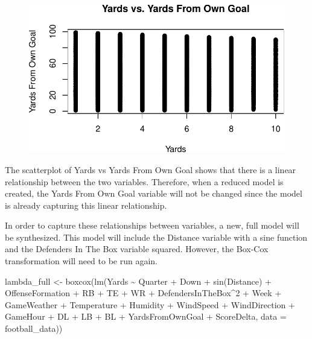 \documentclass[
  super,
  preprint,
  3p]{elsarticle}
\newenvironment{Shaded}{\begin{snugshade}}{\end{snugshade}}
\newcommand{\AttributeTok}[1]{\textcolor[rgb]{0.40,0.45,0.13}{#1}}
\newcommand{\DecValTok}[1]{\textcolor[rgb]{0.68,0.00,0.00}{#1}}
\newcommand{\FunctionTok}[1]{\textcolor[rgb]{0.28,0.35,0.67}{#1}}
\newcommand{\NormalTok}[1]{\textcolor[rgb]{0.00,0.23,0.31}{#1}}
\newcommand{\OtherTok}[1]{\textcolor[rgb]{0.00,0.23,0.31}{#1}}
\newcommand{\SpecialCharTok}[1]{\textcolor[rgb]{0.37,0.37,0.37}{#1}}
\begin{document}
\begin{figure}[H]

{\centering \includegraphics{project_report_files/figure-pdf/unnamed-chunk-30-1.pdf}

}

\end{figure}

The scatterplot of Yards vs Yards From Own Goal shows that there is a
linear relationship between the two variables. Therefore, when a reduced
model is created, the Yards From Own Goal variable will not be changed
since the model is already capturing this linear relationship.

In order to capture these relationships between variables, a new, full
model will be synthesized. This model will include the Distance variable
with a sine function and the Defenders In The Box variable squared.
However, the Box-Cox transformation will need to be run again.

\begin{Shaded}
\begin{Highlighting}[]
\NormalTok{lambda\_full }\OtherTok{\textless{}{-}} \FunctionTok{boxcox}\NormalTok{(}\FunctionTok{lm}\NormalTok{(Yards }\SpecialCharTok{\textasciitilde{}}\NormalTok{ Quarter }\SpecialCharTok{+}\NormalTok{ Down }\SpecialCharTok{+} \FunctionTok{sin}\NormalTok{(Distance) }\SpecialCharTok{+}\NormalTok{ OffenseFormation }\SpecialCharTok{+}\NormalTok{ RB }\SpecialCharTok{+}\NormalTok{ TE }\SpecialCharTok{+}\NormalTok{ WR }\SpecialCharTok{+}\NormalTok{ DefendersInTheBox}\SpecialCharTok{\^{}}\DecValTok{2} \SpecialCharTok{+}\NormalTok{ Week }\SpecialCharTok{+}\NormalTok{ GameWeather }\SpecialCharTok{+}\NormalTok{ Temperature }\SpecialCharTok{+}\NormalTok{ Humidity }\SpecialCharTok{+}\NormalTok{ WindSpeed }\SpecialCharTok{+}\NormalTok{ WindDirection }\SpecialCharTok{+}\NormalTok{ GameHour }\SpecialCharTok{+}\NormalTok{ DL }\SpecialCharTok{+}\NormalTok{ LB }\SpecialCharTok{+}\NormalTok{ BL }\SpecialCharTok{+}\NormalTok{ YardsFromOwnGoal }\SpecialCharTok{+}\NormalTok{ ScoreDelta, }\AttributeTok{data =}\NormalTok{ football\_data))}
\end{Highlighting}
\end{Shaded}
\end{document}
